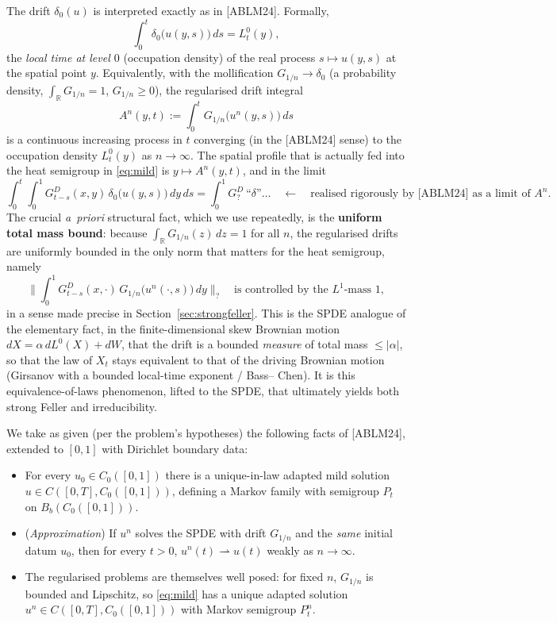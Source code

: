 \documentclass[11pt]{article}
\newcommand{\R}{\mathbb{R}}
\newcommand{\C}{C_0([0,1])}
\begin{document}
The drift $\delta_0(u)$ is interpreted exactly as in [ABLM24]. Formally,
\[
\int_0^t \delta_0\big(u(y,s)\big)\,ds=L^0_t(y),
\]
the \emph{local time at level $0$} (occupation density) of the real process
$s\mapsto u(y,s)$ at the spatial point $y$. Equivalently, with the
mollification $G_{1/n}\to\delta_0$ (a probability density, $\int_\R
G_{1/n}=1$, $G_{1/n}\ge0$), the regularised drift integral
\[
A^n(y,t):=\int_0^t G_{1/n}\big(u^n(y,s)\big)\,ds
\]
is a continuous increasing process in $t$ converging (in the [ABLM24] sense) to
the occupation density $L^0_t(y)$ as $n\to\infty$. The spatial profile that is
actually fed into the heat semigroup in \eqref{eq:mild} is
$y\mapsto A^n(y,t)$, and in the limit
\[
\int_0^t\!\!\int_0^1 G^D_{t-s}(x,y)\,\delta_0\big(u(y,s)\big)\,dy\,ds
=\int_0^1 G^D_{?}\ \text{``}\delta\text{''}\dots
\quad\longleftarrow\quad
\text{realised rigorously by [ABLM24] as a limit of }A^n .
\]
The crucial \emph{a~priori} structural fact, which we use repeatedly, is the
\textbf{uniform total mass bound}: because $\int_\R G_{1/n}(z)\,dz=1$ for all
$n$, the regularised drifts are uniformly bounded in the only norm that matters
for the heat semigroup, namely
\begin{equation}\label{eq:massbound}
\Big\|\int_0^1 G^D_{t-s}(x,\cdot)\,G_{1/n}\big(u^n(\cdot,s)\big)\,dy\Big\|_{?}
\quad\text{is controlled by the }L^1\text{-mass }1,
\end{equation}
in a sense made precise in Section~\ref{sec:strongfeller}. This is the SPDE
analogue of the elementary fact, in the finite-dimensional skew Brownian
motion $dX=\alpha\,dL^0(X)+dW$, that the drift is a bounded \emph{measure} of
total mass $\le|\alpha|$, so that the law of $X_t$ stays equivalent to that of
the driving Brownian motion (Girsanov with a bounded local-time exponent / Bass--
Chen). It is this equivalence-of-laws phenomenon, lifted to the SPDE, that
ultimately yields both strong Feller and irreducibility.

\smallskip
We take as given (per the problem's hypotheses) the following facts of
[ABLM24], extended to $[0,1]$ with Dirichlet boundary data:
\begin{itemize}
\item[(H1)] For every $u_0\in\C$ there is a unique-in-law adapted mild solution
$u\in C([0,T],\C)$, defining a Markov family with semigroup $P_t$ on
$B_b(\C)$.
\item[(H2)] (\emph{Approximation}) If $u^n$ solves the SPDE with drift
$G_{1/n}$ and the \emph{same} initial datum $u_0$, then for every $t>0$,
$u^n(t)\rightharpoonup u(t)$ weakly as $n\to\infty$.
\item[(H3)] The regularised problems are themselves well posed: for fixed $n$,
$G_{1/n}$ is bounded and Lipschitz, so \eqref{eq:mild} has a unique adapted
solution $u^n\in C([0,T],\C)$ with Markov semigroup $P_t^n$.
\end{itemize}
\end{document}

